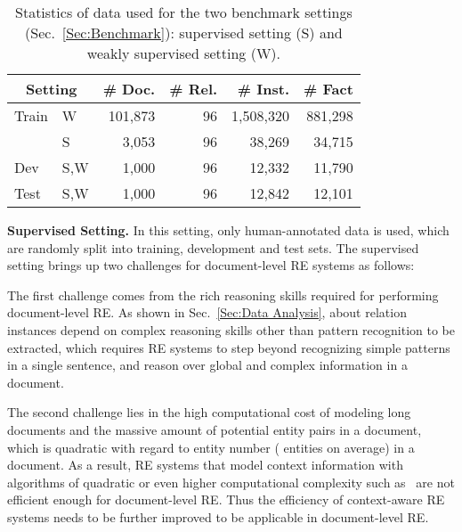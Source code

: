 \documentclass[11pt,a4paper]{article}
\begin{document}
\begin{table}
    \begin{center}
    \small
    \begin{tabular}{p{2em}p{1em}rrrr}
    \toprule
    \multicolumn{2}{c}{Setting} & \# Doc. & \# Rel. & \# Inst. &\# Fact \\
    \midrule
    Train & W & 101,873 & 96& 1,508,320 & 881,298 \\
     & S & 3,053 & 96& 38,269 & 34,715 \\
    Dev & S,W & 1,000  & 96& 12,332 & 11,790 \\
    Test & S,W & 1,000 & 96& 12,842 & 12,101 \\
    \bottomrule
    \end{tabular}
    \end{center}
    \caption{Statistics of data used for the two benchmark settings (Sec.~\ref{Sec:Benchmark}): supervised setting (S) and weakly supervised setting (W).}
    \label{tab:data split}
    \vspace{-0.5em}
\end{table}


\smallskip
\noindent
\textbf{Supervised Setting.}
In this setting, only human-annotated data is used, which are randomly split into training, development and test sets. The supervised setting brings up two challenges for document-level RE systems as follows:

The first challenge comes from the rich reasoning skills required for performing document-level RE. As shown in Sec.~\ref{Sec:Data Analysis}, about  relation instances depend on complex reasoning skills other than pattern recognition to be extracted, which requires RE systems to step beyond recognizing simple patterns in a single sentence, and reason over global and complex information in a document.

The second challenge lies in the high computational cost of modeling long documents and the massive amount of potential entity pairs in a document, which is quadratic with regard to entity number ( entities on average) in a document. As a result, RE systems that model context information with algorithms of quadratic or even higher computational complexity such as~\cite{DBLP:conf/emnlp/SorokinG17,christopoulou2019walk} are not efficient enough for document-level RE. Thus the efficiency of context-aware RE systems needs to be further improved to be applicable in document-level RE.
\end{document}
